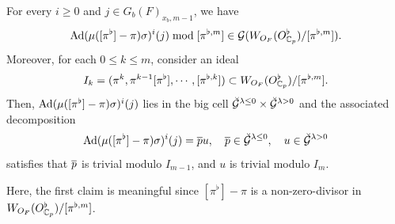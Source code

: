 \documentclass[12pt,reqno]{amsart}
\begin{document}
\begin{lem} \label{lem:AdbCM}
    For every $i \geq 0$ and $j \in G_b(F)_{x_b, m-1}$, we have 
    \[
        {\operatorname{Ad}}(\mu([\pi^\flat] - \pi) \sigma)^i(j) \bmod{[\pi^{\flat, m}]} \in {\mathcal{G}}(W_{O_F}(O_{\mathbb{C}_p}^\flat)/[\pi^{\flat, m}]). 
    \]
    Moreover, for each $0 \leq k \leq m$, consider an ideal
    \[
        I_k = (\pi^k, \pi^{k-1}[\pi^\flat], \cdots, [\pi^{\flat, k}]) \subset W_{O_F}(O_{\mathbb{C}_p}^\flat) / [\pi^{\flat, m}]. 
    \]
    Then, ${\operatorname{Ad}}(\mu([\pi^\flat]-\pi) \sigma)^i(j)$ lies in the big cell ${\mathcal{\breve{G}}}^{\lambda \leq 0} \times {\mathcal{\breve{G}}}^{\lambda > 0}$ and the associated decomposition
    \[
        {\operatorname{Ad}}(\mu([\pi^\flat]-\pi) \sigma)^i(j) = {\overline{p}} u ,\quad 
        {\overline{p}} \in {\mathcal{\breve{G}}}^{\lambda \leq 0} , \quad u \in {\mathcal{\breve{G}}}^{\lambda > 0}
    \]
    satisfies that ${\overline{p}}$ is trivial modulo $I_{m-1}$, and $u$ is trivial modulo $I_m$.  
\end{lem}

Here, the first claim is meaningful since $[\pi^\flat] - \pi$ is a non-zero-divisor in $W_{O_F}(O_{\mathbb{C}_p}^\flat)/[\pi^{\flat, m}]$. 
\end{document}
